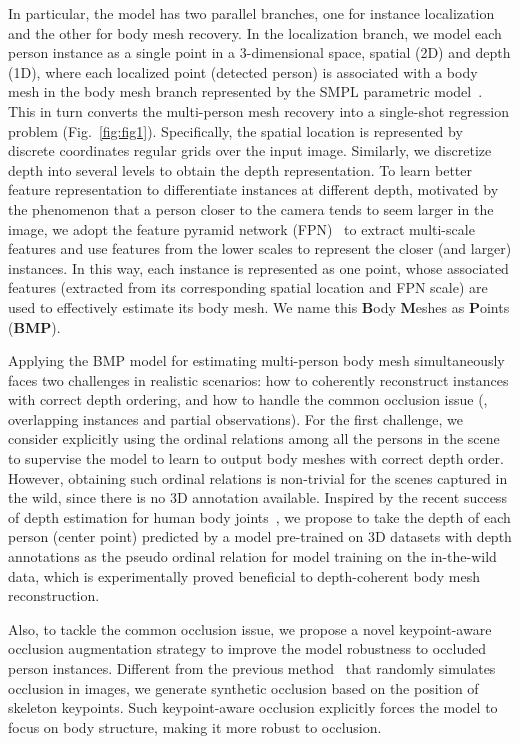 \documentclass[final]{cvpr}
\begin{document}
In particular, the model has two parallel branches, one for instance localization and the other for body mesh recovery.
In the localization branch, we model each person instance as a single point in a 3-dimensional space, \ie spatial (2D) and depth (1D),
where each localized point (detected person) is associated with a body mesh in the body mesh branch represented by the SMPL parametric model~\cite{loper2015smpl}.
This in turn converts the multi-person mesh recovery into a single-shot regression problem (Fig.~\ref{fig:fig1}). 
Specifically, the spatial location is represented by discrete coordinates \wrt regular grids over the input image.
Similarly, we discretize depth into several levels to obtain the depth representation. 
To learn better feature representation to differentiate instances at different depth, motivated by the phenomenon that a person closer to the camera tends to seem larger in the image, we adopt the feature pyramid network (FPN)~\cite{lin2017feature} to extract multi-scale features and use features from the lower scales to represent the closer (and larger) instances.
In this way, each instance is represented as one point, whose associated features (extracted from its corresponding spatial location and FPN scale) are used to effectively estimate its body mesh.
We name this 
\textbf{B}ody \textbf{M}eshes as \textbf{P}oints (\textbf{BMP}). 


Applying the BMP model for estimating multi-person body mesh simultaneously faces two challenges in realistic scenarios: how to coherently reconstruct instances with correct depth ordering, and  how to handle the common occlusion issue (\eg, overlapping instances and partial observations).
For the first challenge, we consider explicitly using the ordinal relations among all the persons in the scene to supervise the model to learn to output body meshes with correct depth order.
However, obtaining such ordinal relations is non-trivial for the scenes captured in the wild, since there is no 3D annotation available. 
Inspired by the recent success of depth estimation for human body joints~\cite{moon2019camera,zhen2020smap}, we propose to take the depth of each person (center point) predicted by a model pre-trained on 3D datasets with depth annotations as the pseudo ordinal relation for model training on the in-the-wild data, which is experimentally proved beneficial to depth-coherent body mesh reconstruction.


Also, to tackle the common occlusion issue, we propose a novel keypoint-aware occlusion augmentation strategy to improve the model robustness to occluded person instances.
Different from the previous method~\cite{sarandi2018robust} that randomly simulates occlusion in images, we generate synthetic occlusion based on the position of skeleton keypoints.
Such keypoint-aware occlusion explicitly forces the model to focus on body structure, making it more robust to occlusion.
\end{document}
